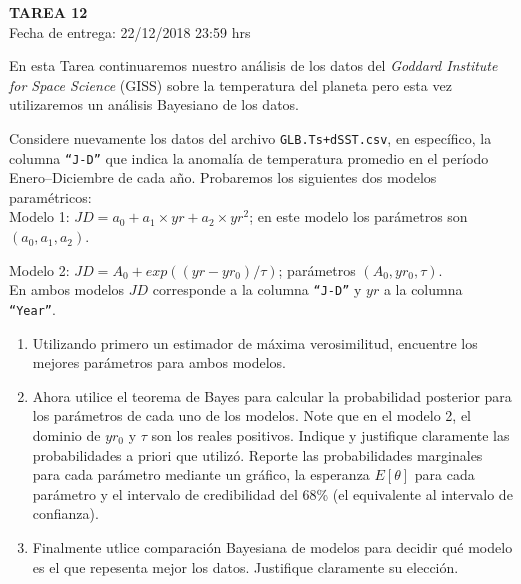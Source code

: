 \documentclass[letter, 11pt]{article}
\newcommand{\tareanro}{12}
\newcommand{\fechaentrega}{22/12/2018 23:59 hrs}
\begin{document}
\thispagestyle{firstpage}

\begin{center}
  {\uppercase{\LARGE \bf Tarea \tareanro}}\\
  Fecha de entrega: \fechaentrega
\end{center}



En esta Tarea continuaremos nuestro análisis de los datos del \emph{Goddard
Institute for Space Science} (GISS) sobre la temperatura del planeta pero esta
vez utilizaremos un análisis Bayesiano de los datos.

Considere nuevamente los datos del archivo \texttt{GLB.Ts+dSST.csv}, en
específico, la columna \texttt{``J-D''} que indica la anomalía de temperatura
promedio en el período Enero--Diciembre de cada año. Probaremos los siguientes
dos modelos paramétricos:\\

\noindent Modelo 1: $JD = a_0 + a_1 \times yr + a_2 \times yr^2$; en este modelo
los parámetros son $(a_0, a_1, a_2)$.

\noindent Modelo 2: $JD = A_0 + exp((yr-yr_0) / \tau)$; parámetros $(A_0, yr_0,
\tau)$.\\

\noindent En ambos modelos $JD$ corresponde a la columna \texttt{``J-D''} y
$yr$ a la columna \texttt{``Year''}.

\begin{enumerate}

  \item Utilizando primero un estimador de máxima verosimilitud, encuentre los
    mejores parámetros para ambos modelos.

  \item Ahora utilice el teorema de Bayes para calcular la probabilidad
    posterior para los parámetros de cada uno de los modelos. Note que en el
    modelo 2, el dominio de $yr_0$ y $\tau$ son los reales positivos. Indique y
    justifique claramente las probabilidades a priori que utilizó. Reporte las
    probabilidades marginales para cada parámetro mediante un gráfico, la
    esperanza $E[\theta]$ para cada parámetro y el intervalo de credibilidad del
    68\% (el equivalente al intervalo de confianza).

  \item Finalmente utlice comparación Bayesiana de modelos para decidir qué
    modelo es el que repesenta mejor los datos. Justifique claramente su
    elección.

\end{enumerate}
\end{document}
